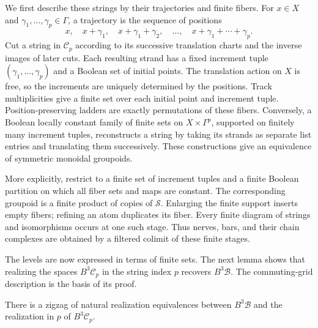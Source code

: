 We first describe these strings by their trajectories and finite fibers.
For $x\in X$ and $\gamma_1,\ldots,\gamma_p\in\Gamma$, a
trajectory is the sequence of positions
\[
 x,\quad x+\gamma_1,\quad x+\gamma_1+\gamma_2,\quad\ldots,
 \quad x+\gamma_1+\cdots+\gamma_p.
\]
Cut a string in $\mathcal C_p$ according to its successive
translation charts and the inverse images of later cuts.  Each
resulting strand has a fixed increment tuple
$(\gamma_1,\ldots,\gamma_p)$ and a Boolean set of initial points.
The translation action on $X$ is free, so the increments are
uniquely determined by the positions.  Track multiplicities give
a finite set over each initial point and increment tuple.
Position-preserving ladders are exactly permutations of these
fibers.  Conversely, a Boolean locally constant family of finite
sets on $X\times\Gamma^p$, supported on finitely many increment
tuples, reconstructs a string by taking its strands as separate
list entries and translating them successively.  These
constructions give an equivalence of symmetric monoidal
groupoids.

More explicitly, restrict to a finite set of increment tuples
and a finite Boolean partition on which all fiber sets and maps
are constant.  The corresponding groupoid is a finite product
of copies of $\mathcal S$.  Enlarging the finite support inserts
empty fibers; refining an atom duplicates its fiber.  Every
finite diagram of strings and isomorphisms occurs at one such
stage.  Thus nerves, bars, and their chain complexes are obtained
by a filtered colimit of these finite stages.

The levels are now expressed in terms of finite sets.  The next lemma
shows that realizing the spaces $B^3\mathcal C_p$ in the string index
$p$ recovers $B^3\mathcal B$.  The commuting-grid description is the
basis of its proof.

\begin{lemma}\label{lem:hom-string-resolution}
There is a zigzag of natural realization equivalences between
$B^3\mathcal B$ and the realization in $p$ of $B^3\mathcal C_p$.
\end{lemma}


